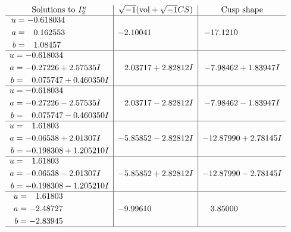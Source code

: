 \documentclass[1p]{elsarticle_modified}
\theoremstyle{definition}
\newcommand{\I}{\sqrt{-1}}
\begin{document}
$$\begin{array}{c|c|c}  
\text{Solutions to }I^u_{2}& \I (\text{vol} + \sqrt{-1}CS) & \text{Cusp shape}\\
 \hline 
\begin{aligned}
u &= -0.618034\phantom{ +0.000000I} \\
a &= \phantom{-}0.162553\phantom{ +0.000000I} \\
b &= \phantom{-}1.08457\phantom{ +0.000000I}\end{aligned}
 & -2.10041\phantom{ +0.000000I} & -17.1210\phantom{ +0.000000I} \\ \hline\begin{aligned}
u &= -0.618034\phantom{ +0.000000I} \\
a &= -0.27226 + 2.57535 I \\
b &= \phantom{-}0.075747 + 0.460350 I\end{aligned}
 & \phantom{-}2.03717 + 2.82812 I & -7.98462 + 1.83947 I \\ \hline\begin{aligned}
u &= -0.618034\phantom{ +0.000000I} \\
a &= -0.27226 - 2.57535 I \\
b &= \phantom{-}0.075747 - 0.460350 I\end{aligned}
 & \phantom{-}2.03717 - 2.82812 I & -7.98462 - 1.83947 I \\ \hline\begin{aligned}
u &= \phantom{-}1.61803\phantom{ +0.000000I} \\
a &= -0.06538 + 2.01307 I \\
b &= -0.198308 + 1.205210 I\end{aligned}
 & -5.85852 - 2.82812 I & -12.87990 + 2.78145 I \\ \hline\begin{aligned}
u &= \phantom{-}1.61803\phantom{ +0.000000I} \\
a &= -0.06538 - 2.01307 I \\
b &= -0.198308 - 1.205210 I\end{aligned}
 & -5.85852 + 2.82812 I & -12.87990 - 2.78145 I \\ \hline\begin{aligned}
u &= \phantom{-}1.61803\phantom{ +0.000000I} \\
a &= -2.48727\phantom{ +0.000000I} \\
b &= -2.83945\phantom{ +0.000000I}\end{aligned}
 & -9.99610\phantom{ +0.000000I} & \phantom{-}3.85000\phantom{ +0.000000I}\\
 \hline 
 \end{array}$$\newpage\newpage\renewcommand{\arraystretch}{1}
\end{document}
